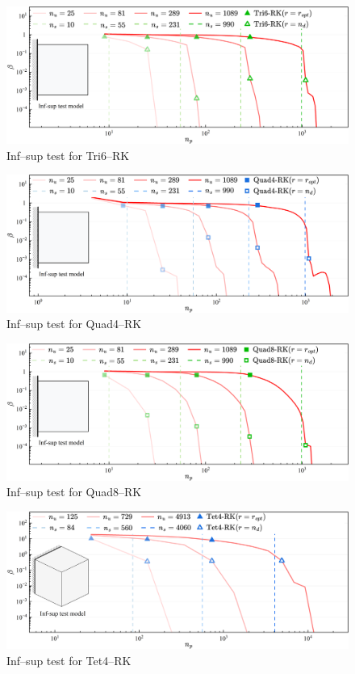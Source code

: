 \begin{figure}[H]
\centering
\includegraphics[width=\textwidth]{png/tri6.png}\caption{Inf--sup test for Tri6--RK}\label{fg:infsup_convergence_2D_b}
\end{figure}

\begin{figure}[H]
\centering
\includegraphics[width=\textwidth]{png/quad4.png}\caption{Inf--sup test for Quad4--RK}\label{fg:infsup_convergence_2D_c}
\end{figure}

\begin{figure}[H]
\centering
\includegraphics[width=\textwidth]{png/quad8.png}\caption{Inf--sup test for Quad8--RK}\label{fg:infsup_convergence_2D_d}
\end{figure}

\begin{figure}[H]
\centering
\includegraphics[width=\textwidth]{png/Tet4.png}\caption{Inf--sup test for Tet4--RK}\label{fg:infsup_convergence_3D_a}
\end{figure}

